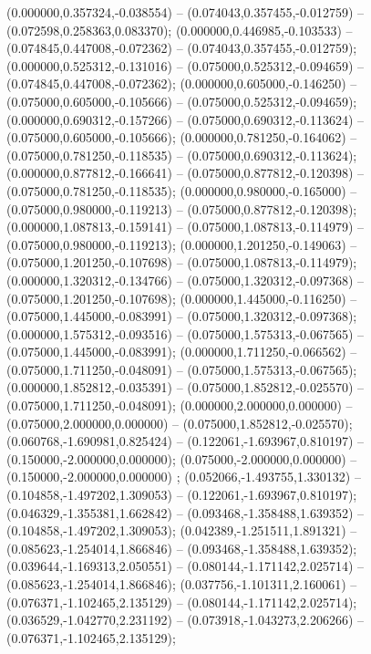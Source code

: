  (0.000000,0.357324,-0.038554) -- (0.074043,0.357455,-0.012759) -- (0.072598,0.258363,0.083370);
 (0.000000,0.446985,-0.103533) -- (0.074845,0.447008,-0.072362) -- (0.074043,0.357455,-0.012759);
 (0.000000,0.525312,-0.131016) -- (0.075000,0.525312,-0.094659) -- (0.074845,0.447008,-0.072362);
 (0.000000,0.605000,-0.146250) -- (0.075000,0.605000,-0.105666) -- (0.075000,0.525312,-0.094659);
 (0.000000,0.690312,-0.157266) -- (0.075000,0.690312,-0.113624) -- (0.075000,0.605000,-0.105666);
 (0.000000,0.781250,-0.164062) -- (0.075000,0.781250,-0.118535) -- (0.075000,0.690312,-0.113624);
 (0.000000,0.877812,-0.166641) -- (0.075000,0.877812,-0.120398) -- (0.075000,0.781250,-0.118535);
 (0.000000,0.980000,-0.165000) -- (0.075000,0.980000,-0.119213) -- (0.075000,0.877812,-0.120398);
 (0.000000,1.087813,-0.159141) -- (0.075000,1.087813,-0.114979) -- (0.075000,0.980000,-0.119213);
 (0.000000,1.201250,-0.149063) -- (0.075000,1.201250,-0.107698) -- (0.075000,1.087813,-0.114979);
 (0.000000,1.320312,-0.134766) -- (0.075000,1.320312,-0.097368) -- (0.075000,1.201250,-0.107698);
 (0.000000,1.445000,-0.116250) -- (0.075000,1.445000,-0.083991) -- (0.075000,1.320312,-0.097368);
 (0.000000,1.575312,-0.093516) -- (0.075000,1.575313,-0.067565) -- (0.075000,1.445000,-0.083991);
 (0.000000,1.711250,-0.066562) -- (0.075000,1.711250,-0.048091) -- (0.075000,1.575313,-0.067565);
 (0.000000,1.852812,-0.035391) -- (0.075000,1.852812,-0.025570) -- (0.075000,1.711250,-0.048091);
 (0.000000,2.000000,0.000000) -- (0.075000,2.000000,0.000000) -- (0.075000,1.852812,-0.025570);
 (0.060768,-1.690981,0.825424) -- (0.122061,-1.693967,0.810197) -- (0.150000,-2.000000,0.000000);
 (0.075000,-2.000000,0.000000) -- (0.150000,-2.000000,0.000000) ;
 (0.052066,-1.493755,1.330132) -- (0.104858,-1.497202,1.309053) -- (0.122061,-1.693967,0.810197);
 (0.046329,-1.355381,1.662842) -- (0.093468,-1.358488,1.639352) -- (0.104858,-1.497202,1.309053);
 (0.042389,-1.251511,1.891321) -- (0.085623,-1.254014,1.866846) -- (0.093468,-1.358488,1.639352);
 (0.039644,-1.169313,2.050551) -- (0.080144,-1.171142,2.025714) -- (0.085623,-1.254014,1.866846);
 (0.037756,-1.101311,2.160061) -- (0.076371,-1.102465,2.135129) -- (0.080144,-1.171142,2.025714);
 (0.036529,-1.042770,2.231192) -- (0.073918,-1.043273,2.206266) -- (0.076371,-1.102465,2.135129);
